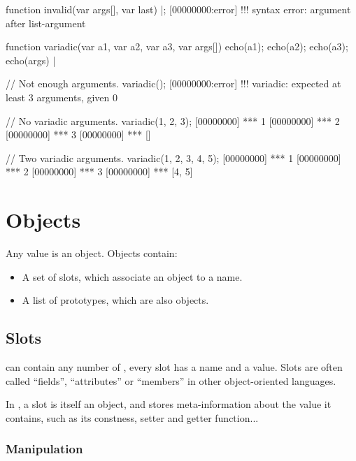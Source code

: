 \begin{comment}
\begin{urbiscript}
removeSlot("variadic")|;
\end{urbiscript}
\end{comment}

\begin{urbiscript}
function invalid(var args[], var last)
{} |;
[00000000:error] !!! syntax error: argument after list-argument

function variadic(var a1, var a2, var a3, var args[])
{
  echo(a1);
  echo(a2);
  echo(a3);
  echo(args)
} |

// Not enough arguments.
variadic();
[00000000:error] !!! variadic: expected at least 3 arguments, given 0

// No variadic arguments.
variadic(1, 2, 3);
[00000000] *** 1
[00000000] *** 2
[00000000] *** 3
[00000000] *** []

// Two variadic arguments.
variadic(1, 2, 3, 4, 5);
[00000000] *** 1
[00000000] *** 2
[00000000] *** 3
[00000000] *** [4, 5]
\end{urbiscript}



\section{Objects}

Any \us value is an object. Objects contain:

\begin{itemize}
\item A set of slots, which associate an object to a name.
\item A list of prototypes, which are also objects.
\end{itemize}

\subsection{Slots}
\label{sec:lang:slots}

 can contain any number of , every slot has a name
and a value. Slots are often called ``fields'', ``attributes'' or
``members'' in other object-oriented languages.

In \us, a slot is itself an object, and stores meta-information about the value
it contains, such as its constness, setter and getter function...

\subsubsection{Manipulation}

